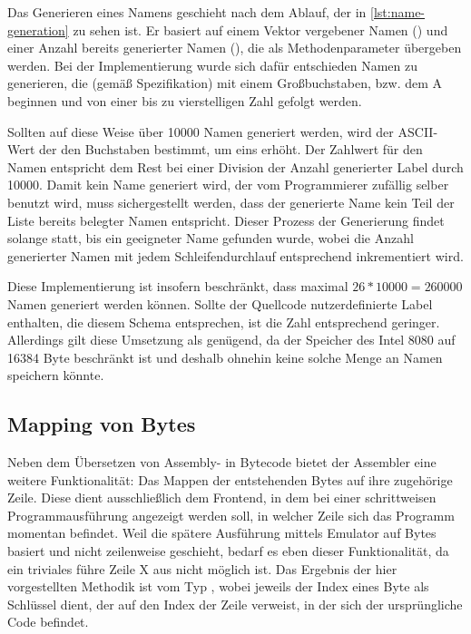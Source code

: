 Das Generieren eines Namens geschieht nach dem Ablauf, der in \ref{lst:name-generation} zu sehen ist. Er basiert auf einem Vektor vergebener Namen () und einer Anzahl bereits generierter Namen (), die als Methodenparameter übergeben werden. Bei der Implementierung wurde sich dafür entschieden Namen zu generieren, die (gemäß Spezifikation) mit einem Großbuchstaben, bzw. dem \glqq A\grqq{} beginnen und von einer bis zu vierstelligen Zahl gefolgt werden.

Sollten auf diese Weise über 10000 Namen generiert werden, wird der ASCII-Wert der den Buchstaben bestimmt, um eins erhöht. Der Zahlwert für den Namen entspricht dem Rest bei einer Division der Anzahl generierter Label durch 10000. Damit kein Name generiert wird, der vom Programmierer zufällig selber benutzt wird, muss sichergestellt werden, dass der generierte Name kein Teil der Liste bereits belegter Namen entspricht. Dieser Prozess der Generierung findet solange statt, bis ein geeigneter Name gefunden wurde, wobei die Anzahl generierter Namen mit jedem Schleifendurchlauf entsprechend inkrementiert wird.

Diese Implementierung ist insofern beschränkt, dass maximal $26 * 10000 = 260000$ Namen generiert werden können. Sollte der Quellcode nutzerdefinierte Label enthalten, die diesem Schema entsprechen, ist die Zahl entsprechend geringer. Allerdings gilt diese Umsetzung als genügend, da der Speicher des Intel 8080 auf 16384 Byte beschränkt ist und deshalb ohnehin keine solche Menge an Namen speichern könnte.

\subsection{Mapping von Bytes}

Neben dem Übersetzen von Assembly- in Bytecode bietet der Assembler eine weitere Funktionalität: Das Mappen der entstehenden Bytes auf ihre zugehörige Zeile. Diese dient ausschließlich dem Frontend, in dem bei einer schrittweisen Programmausführung angezeigt werden soll, in welcher Zeile sich das Programm momentan befindet. Weil die spätere Ausführung mittels Emulator auf Bytes basiert und nicht zeilenweise geschieht, bedarf es eben dieser Funktionalität, da ein triviales \glqq führe Zeile X aus\grqq{} nicht möglich ist. Das Ergebnis der hier vorgestellten Methodik ist vom Typ , wobei jeweils der Index eines Byte als Schlüssel dient, der auf den Index der Zeile verweist, in der sich der ursprüngliche Code befindet.

